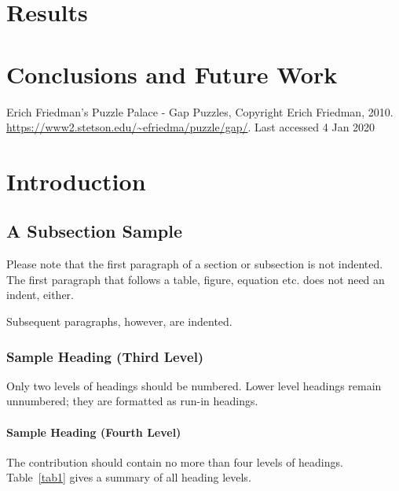 \documentclass[runningheads]{llncs}
\begin{document}
\section{Results}


\section{Conclusions and Future Work}


\begin{thebibliography}{8}
    Erich Friedman's Puzzle Palace - Gap Puzzles, Copyright Erich Friedman, 2010. 
    \url{https://www2.stetson.edu/~efriedma/puzzle/gap/}. 
    Last accessed 4 Jan 2020
    \end{thebibliography}

























\section{Introduction}
\subsection{A Subsection Sample}
Please note that the first paragraph of a section or subsection is
not indented. The first paragraph that follows a table, figure,
equation etc. does not need an indent, either.

Subsequent paragraphs, however, are indented.

\subsubsection{Sample Heading (Third Level)} Only two levels of
headings should be numbered. Lower level headings remain unnumbered;
they are formatted as run-in headings.

\paragraph{Sample Heading (Fourth Level)}
The contribution should contain no more than four levels of
headings. Table~\ref{tab1} gives a summary of all heading levels.
\end{document}
